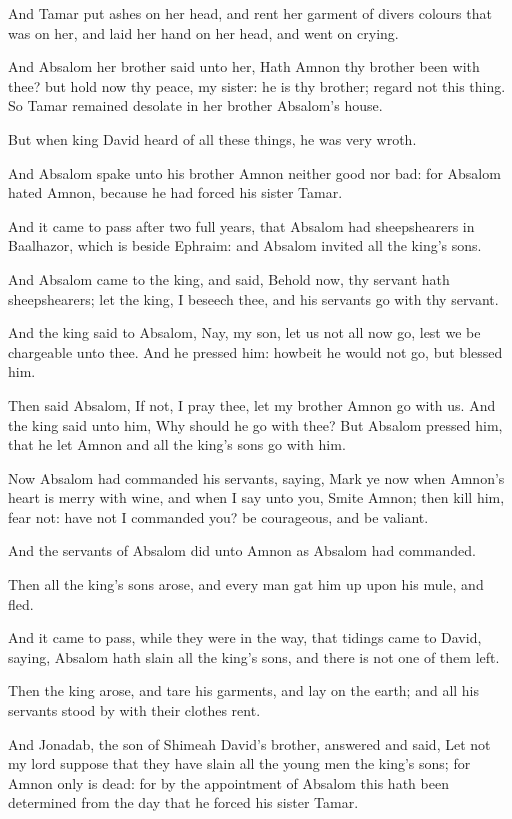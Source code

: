 \verse And Tamar put ashes on her head, and rent her garment of divers colours that was on her, and laid her hand on her head, and went on crying.

\verse And Absalom her brother said unto her, Hath Amnon thy brother been with thee? but hold now thy peace, my sister: he is thy brother; regard not this thing. So Tamar remained desolate in her brother Absalom's house.

\verse But when king David heard of all these things, he was very wroth.

\verse And Absalom spake unto his brother Amnon neither good nor bad: for Absalom hated Amnon, because he had forced his sister Tamar.

\verse And it came to pass after two full years, that Absalom had sheepshearers in Baalhazor, which is beside Ephraim: and Absalom invited all the king's sons.

\verse And Absalom came to the king, and said, Behold now, thy servant hath sheepshearers; let the king, I beseech thee, and his servants go with thy servant.

\verse And the king said to Absalom, Nay, my son, let us not all now go, lest we be chargeable unto thee. And he pressed him: howbeit he would not go, but blessed him.

\verse Then said Absalom, If not, I pray thee, let my brother Amnon go with us. And the king said unto him, Why should he go with thee?  \verse But Absalom pressed him, that he let Amnon and all the king's sons go with him.

\verse Now Absalom had commanded his servants, saying, Mark ye now when Amnon's heart is merry with wine, and when I say unto you, Smite Amnon; then kill him, fear not: have not I commanded you? be courageous, and be valiant.

\verse And the servants of Absalom did unto Amnon as Absalom had commanded.

Then all the king's sons arose, and every man gat him up upon his mule, and fled.

\verse And it came to pass, while they were in the way, that tidings came to David, saying, Absalom hath slain all the king's sons, and there is not one of them left.

\verse Then the king arose, and tare his garments, and lay on the earth; and all his servants stood by with their clothes rent.

\verse And Jonadab, the son of Shimeah David's brother, answered and said, Let not my lord suppose that they have slain all the young men the king's sons; for Amnon only is dead: for by the appointment of Absalom this hath been determined from the day that he forced his sister Tamar.

